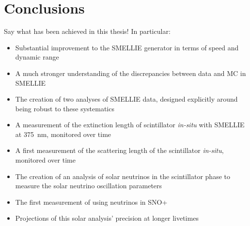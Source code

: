 \chapter{Conclusions}\label{chap:conclusions}
{
    \color{blue}
    Say what has been achieved in this thesis! In particular:
\begin{itemize}
    \item Substantial improvement to the SMELLIE generator in terms of speed and dynamic range
    \item A much stronger understanding of the discrepancies between data and MC in SMELLIE
    \item The creation of two analyses of SMELLIE data, designed explicitly around being robust to these systematics
    \item A measurement of the extinction length of scintillator \textit{in-situ} with SMELLIE at \SI{375}{\nano\metre}, monitored over time
    \item A first measurement of the scattering length of the scintillator \textit{in-situ}, monitored over time
    \item The creation of an analysis of \beight{} solar neutrinos in the scintillator phase to measure the solar neutrino oscillation parameters
    \item The first measurement of \tonetwo{} using \beight{} neutrinos in SNO+
    \item Projections of this solar analysis' precision at longer livetimes

\end{itemize}}
